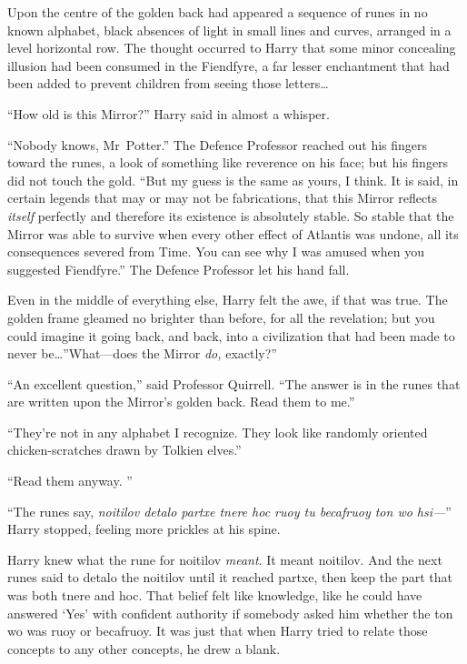 Upon the centre of the golden back had appeared a sequence of runes in no known alphabet, black absences of light in small lines and curves, arranged in a level horizontal row. The thought occurred to Harry that some minor concealing illusion had been consumed in the Fiendfyre, a far lesser enchantment that had been added to prevent children from seeing those letters…

“How old is this Mirror?” Harry said in almost a whisper.

“Nobody knows, Mr~Potter.” The Defence Professor reached out his fingers toward the runes, a look of something like reverence on his face; but his fingers did not touch the gold. “But my guess is the same as yours, I think. It is said, in certain legends that may or may not be fabrications, that this Mirror reflects \emph{itself} perfectly and therefore its existence is absolutely stable. So stable that the Mirror was able to survive when every other effect of Atlantis was undone, all its consequences severed from Time. You can see why I was amused when you suggested Fiendfyre.” The Defence Professor let his hand fall.

Even in the middle of everything else, Harry felt the awe, if that was true. The golden frame gleamed no brighter than before, for all the revelation; but you could imagine it going back, and back, into a civilization that had been made to never be…”What—does the Mirror \emph{do,} exactly?”

“An excellent question,” said Professor Quirrell. “The answer is in the runes that are written upon the Mirror’s golden back. Read them to me.”

“They’re not in any alphabet I recognize. They look like randomly oriented chicken-scratches drawn by Tolkien elves.”

“Read them anyway. ”

“The runes say, \emph{noitilov detalo partxe tnere hoc ruoy tu becafruoy ton wo hsi—}” Harry stopped, feeling more prickles at his spine.

Harry knew what the rune for noitilov \emph{meant}. It meant noitilov. And the next runes said to detalo the noitilov until it reached partxe, then keep the part that was both tnere and hoc. That belief felt like knowledge, like he could have answered ‘Yes’ with confident authority if somebody asked him whether the ton wo was ruoy or becafruoy. It was just that when Harry tried to relate those concepts to any other concepts, he drew a blank.

